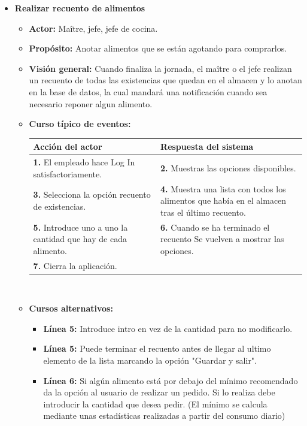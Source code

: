 \documentclass[spanish,a4paper,12pt]{report}		%
\begin{document}
\begin{itemize}
	\item \textbf{Realizar recuento de alimentos}
			\begin{itemize}
			\item \textbf{Actor:} Maître, jefe, jefe de cocina.
			\item \textbf{Propósito: } Anotar alimentos que se están agotando para comprarlos.
			\item \textbf{Visión general:} Cuando finaliza la jornada, el maître o el jefe realizan un recuento de todas las existencias que quedan en el almacen y lo anotan en la base de datos, la cual mandará una notificación cuando sea necesario reponer algun alimento.
	\newpage
			\item \textbf{Curso típico de eventos:} 	\\
				\begin{tabular}{|p{6cm}||p{6cm}|}
				\hline
				\textbf{Acción del actor} & \textbf{Respuesta del sistema} \\ \hline
				\textbf{1.} El empleado hace Log In satisfactoriamente. & \textbf{2.} Muestras las opciones disponibles. \\ \hline
				\textbf{3.} Selecciona la opción recuento de existencias. & \textbf{4.} Muestra una lista con todos los alimentos que había en el almacen tras el último recuento. \\ \hline
				\textbf{5.} Introduce uno a uno la cantidad que hay de cada alimento. & \textbf{6.} Cuando se ha terminado el recuento Se vuelven a mostrar las opciones. \\ \hline
				\textbf{7.}  Cierra la aplicación. &   \\ \hline
			\end{tabular}
			\\
			\item \textbf{Cursos alternativos:} 
			\begin{itemize}
			\item  \textbf{Línea 5:} Introduce intro en vez de la cantidad para no modificarlo.
			\item  \textbf{Línea 5:} Puede terminar el recuento antes de llegar al ultimo elemento de la lista marcando la opción "Guardar y salir".
			\item  \textbf{Línea 6:} Si algún alimento está por debajo del mínimo recomendado da la opción al usuario de realizar un pedido. Si lo realiza debe introducir la cantidad que desea pedir. (El mínimo se calcula mediante unas estadísticas realizadas a partir del consumo diario)
			\end {itemize}
		\end {itemize}


\end{itemize}
\end{document}
